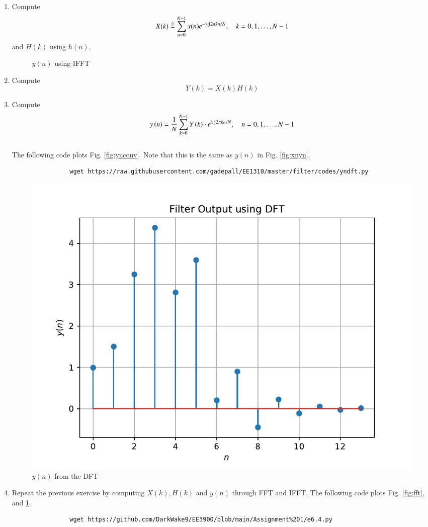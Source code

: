 \documentclass[journal,12pt,twocolumn]{IEEEtran}
\renewcommand\thesection{\arabic{section}}
\begin{document}
		\begin{enumerate}[label=\thesection.\arabic*]
			\item
			Compute
			\begin{equation}
				X(k) \define \sum _{n=0}^{N-1}x(n) e^{-\j2\pi kn/N}, \quad k = 0,1,\dots, N-1
			\end{equation}
			and $H(k)$ using $h(n)$.
			\begin{figure}[!ht]
				\centering
				\caption{$y(n)$ using IFFT}
				\label{fig:ifft}
			\end{figure}
			\item Compute 
			\begin{equation}
				Y(k) = X(k)H(k)
			\end{equation}
			\item Compute
			\begin{equation}
				y\brak{n}={\frac {1}{N}}\sum _{k=0}^{N-1}Y\brak{k}\cdot e^{\j 2\pi kn/N},\quad n = 0,1,\dots, N-1
			\end{equation}
			\\
			\solution The following code plots Fig. \ref{fig:ynconv}. Note that this is the same as 
			$y(n)$ in  Fig. 
			\ref{fig:xnyn}. 
			\begin{lstlisting}
				wget https://raw.githubusercontent.com/gadepall/EE1310/master/filter/codes/yndft.py
			\end{lstlisting}
			\begin{figure}[!ht]
				\centering
				\includegraphics[width=\columnwidth]{./figs/yndft}
				\caption{$y(n)$ from the DFT}
				\label{fig:yndft}
			\end{figure}
			\vspace{2cm}
			\item Repeat the previous exercise by computing $X(k), H(k)$ and $y(n)$ through FFT and 
			IFFT.
			\solution The following code plots Fig. \ref{fig:fft}, and \ref{fig:ifft}. 
			\begin{lstlisting}
				wget https://github.com/DarkWake9/EE3900/blob/main/Assignment%201/e6.4.py
			\end{lstlisting}
			\begin{enumerate}
				

\end{enumerate}
\end{enumerate}
\end{document}
